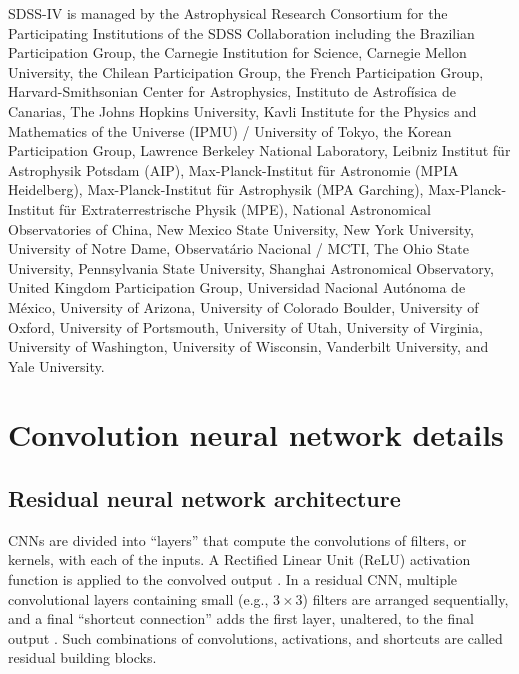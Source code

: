 \documentclass[fleqn,usenatbib]{mnras}
\begin{document}
SDSS-IV is managed by the Astrophysical Research Consortium for the
Participating Institutions of the SDSS Collaboration including the
Brazilian Participation Group, the Carnegie Institution for Science,
Carnegie Mellon University, the Chilean Participation Group, the French Participation Group, Harvard-Smithsonian Center for Astrophysics,
Instituto de Astrof\'isica de Canarias, The Johns Hopkins University,
Kavli Institute for the Physics and Mathematics of the Universe (IPMU) /
University of Tokyo, the Korean Participation Group, Lawrence Berkeley National Laboratory,
Leibniz Institut f\"ur Astrophysik Potsdam (AIP),
Max-Planck-Institut f\"ur Astronomie (MPIA Heidelberg),
Max-Planck-Institut f\"ur Astrophysik (MPA Garching),
Max-Planck-Institut f\"ur Extraterrestrische Physik (MPE),
National Astronomical Observatories of China, New Mexico State University,
New York University, University of Notre Dame,
Observat\'ario Nacional / MCTI, The Ohio State University,
Pennsylvania State University, Shanghai Astronomical Observatory,
United Kingdom Participation Group,
Universidad Nacional Aut\'onoma de M\'exico, University of Arizona,
University of Colorado Boulder, University of Oxford, University of Portsmouth,
University of Utah, University of Virginia, University of Washington, University of Wisconsin,
Vanderbilt University, and Yale University.





\appendix
%
\section{Convolution neural network details}

\subsection{Residual neural network architecture}
CNNs are divided into ``layers'' that compute the convolutions of filters, or kernels, with each of the inputs.
A Rectified Linear Unit (ReLU) activation function is applied to the convolved output \citep[ReLUs have been shown to propagate information about the relative importances of different features, and are effective for training deep neural networks;][]{Nair2010}.
In a residual CNN, multiple convolutional layers containing small (e.g., $3\times 3$) filters are arranged sequentially, and a final ``shortcut connection'' adds the first layer, unaltered, to the final output \citep[before the final ReLU activation; see, e.g., Figure~2 of][]{He2015}.
Such combinations of convolutions, activations, and shortcuts are called residual building blocks.
\end{document}
